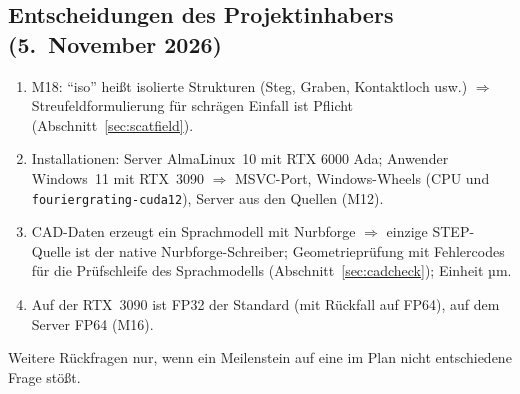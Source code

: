 \subsection{Entscheidungen des Projektinhabers (5.~November 2026)}
\begin{enumerate}[nosep]
  \item M18: \enquote{iso} heißt isolierte Strukturen (Steg, Graben, Kontaktloch usw.) $\Rightarrow$ Streufeldformulierung für
        schrägen Einfall ist Pflicht (Abschnitt~\ref{sec:scatfield}).
  \item Installationen: Server AlmaLinux~10 mit RTX 6000 Ada; Anwender Windows~11 mit RTX~3090 $\Rightarrow$ MSVC-Port,
        Windows-Wheels (CPU und \verb|fouriergrating-cuda12|), Server aus den Quellen (M12).
  \item CAD-Daten erzeugt ein Sprachmodell mit Nurbforge $\Rightarrow$ einzige STEP-Quelle ist der native Nurbforge-Schreiber;
        Geometrieprüfung mit Fehlercodes für die Prüfschleife des Sprachmodells (Abschnitt~\ref{sec:cadcheck}); Einheit µm.
  \item Auf der RTX~3090 ist FP32 der Standard (mit Rückfall auf FP64), auf dem Server FP64 (M16).
\end{enumerate}
Weitere Rückfragen nur, wenn ein Meilenstein auf eine im Plan nicht entschiedene Frage stößt.

